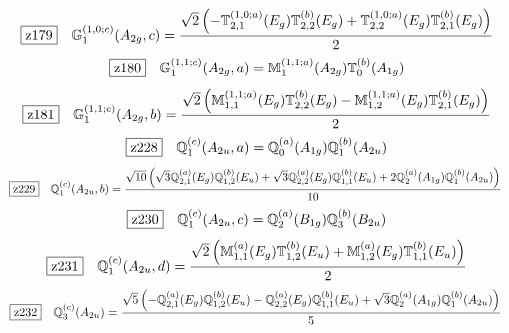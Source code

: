 \documentclass[fleqn,10pt,landscape]{jsarticle}
\begin{document}
\begin{dmath*}
\hspace*{3mm}\fbox{z179}\quad \mathbb{G}_{1}^{(1,0;c)}(A_{2g},c)=\frac{\sqrt{2} \left(- \mathbb{T}_{2,1}^{(1,0;a)}(E_{g}) \mathbb{T}_{2,2}^{(b)}(E_{g}) + \mathbb{T}_{2,2}^{(1,0;a)}(E_{g}) \mathbb{T}_{2,1}^{(b)}(E_{g})\right)}{2}
\end{dmath*}
\begin{dmath*}
\hspace*{3mm}\fbox{z180}\quad \mathbb{G}_{1}^{(1,1;c)}(A_{2g},a)=\mathbb{M}_{1}^{(1,1;a)}(A_{2g}) \mathbb{T}_{0}^{(b)}(A_{1g})
\end{dmath*}
\begin{dmath*}
\hspace*{3mm}\fbox{z181}\quad \mathbb{G}_{1}^{(1,1;c)}(A_{2g},b)=\frac{\sqrt{2} \left(\mathbb{M}_{1,1}^{(1,1;a)}(E_{g}) \mathbb{T}_{2,2}^{(b)}(E_{g}) - \mathbb{M}_{1,2}^{(1,1;a)}(E_{g}) \mathbb{T}_{2,1}^{(b)}(E_{g})\right)}{2}
\end{dmath*}
\begin{dmath*}
\hspace*{3mm}\fbox{z228}\quad \mathbb{Q}_{1}^{(c)}(A_{2u},a)=\mathbb{Q}_{0}^{(a)}(A_{1g}) \mathbb{Q}_{1}^{(b)}(A_{2u})
\end{dmath*}
\begin{dmath*}
\hspace*{3mm}\fbox{z229}\quad \mathbb{Q}_{1}^{(c)}(A_{2u},b)=\frac{\sqrt{10} \left(\sqrt{3} \mathbb{Q}_{2,1}^{(a)}(E_{g}) \mathbb{Q}_{1,2}^{(b)}(E_{u}) + \sqrt{3} \mathbb{Q}_{2,2}^{(a)}(E_{g}) \mathbb{Q}_{1,1}^{(b)}(E_{u}) + 2 \mathbb{Q}_{2}^{(a)}(A_{1g}) \mathbb{Q}_{1}^{(b)}(A_{2u})\right)}{10}
\end{dmath*}
\begin{dmath*}
\hspace*{3mm}\fbox{z230}\quad \mathbb{Q}_{1}^{(c)}(A_{2u},c)=\mathbb{Q}_{2}^{(a)}(B_{1g}) \mathbb{Q}_{3}^{(b)}(B_{2u})
\end{dmath*}
\begin{dmath*}
\hspace*{3mm}\fbox{z231}\quad \mathbb{Q}_{1}^{(c)}(A_{2u},d)=\frac{\sqrt{2} \left(\mathbb{M}_{1,1}^{(a)}(E_{g}) \mathbb{T}_{1,2}^{(b)}(E_{u}) + \mathbb{M}_{1,2}^{(a)}(E_{g}) \mathbb{T}_{1,1}^{(b)}(E_{u})\right)}{2}
\end{dmath*}
\begin{dmath*}
\hspace*{3mm}\fbox{z232}\quad \mathbb{Q}_{3}^{(c)}(A_{2u})=\frac{\sqrt{5} \left(- \mathbb{Q}_{2,1}^{(a)}(E_{g}) \mathbb{Q}_{1,2}^{(b)}(E_{u}) - \mathbb{Q}_{2,2}^{(a)}(E_{g}) \mathbb{Q}_{1,1}^{(b)}(E_{u}) + \sqrt{3} \mathbb{Q}_{2}^{(a)}(A_{1g}) \mathbb{Q}_{1}^{(b)}(A_{2u})\right)}{5}
\end{dmath*}
\end{document}
